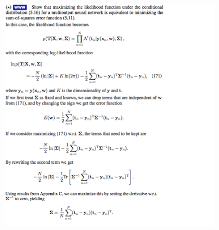 \begin{figure}[H]
        \includegraphics[width=\columnwidth]{images/bishop5-3.png}
        
        \label{fig:my_labeflf}
    \end{figure}

